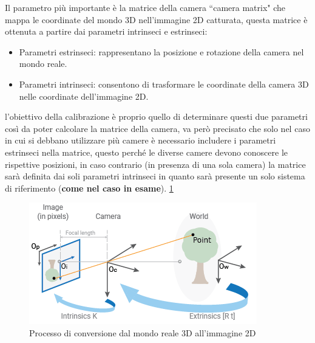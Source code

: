 \documentclass[12pt,a4paper,openright,twoside]{book}
\begin{document}
Il parametro più importante è la matrice della camera ``camera matrix" che mappa le coordinate del mondo 3D nell'immagine 2D catturata, questa matrice è ottenuta a partire dai parametri intrinseci e estrinseci:
\begin{itemize}
	\item Parametri estrinseci: rappresentano la posizione e rotazione della camera nel mondo reale.
	\item Parametri intrinseci: consentono di trasformare le coordinate della camera 3D nelle coordinate dell'immagine 2D.
\end{itemize}
l'obiettivo della calibrazione è proprio quello di determinare questi due parametri così da poter calcolare la matrice della camera, va però precisato che solo nel caso in cui si debbano utilizzare più camere è necessario includere i parametri estrinseci nella matrice, questo perché le diverse camere devono conoscere le rispettive posizioni, in caso contrario (in presenza di una sola camera) la matrice sarà definita dai soli parametri intrinseci in quanto sarà presente un solo sistema di riferimento (\textbf{come nel caso in esame}). \ref{fig:calibration_cameramodel_coords}
\begin{figure}[h!]
	\centering
	\includegraphics[width=0.5\linewidth]{./figures/calibration-cameramodel-coords.png}
	\caption{Processo di conversione dal mondo reale 3D all'immagine 2D}
	\label{fig:calibration_cameramodel_coords}
\end{figure}
\end{document}
